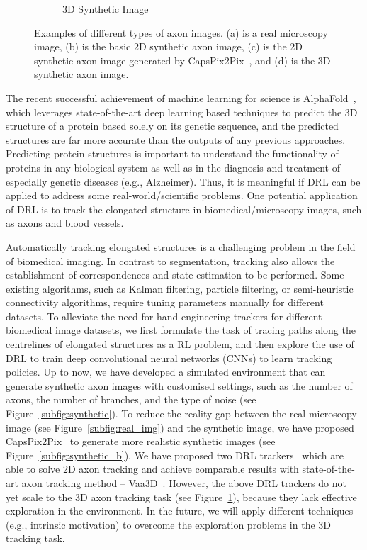 \begin{figure}[h]
\begin{subfigure}[t]{0.24\textwidth}
    \caption{3D Synthetic Image}
    \label{subfig:3d_synthetic}
  \end{subfigure}\hfill
  \caption[Examples of different types of axon images.]{Examples of different types of axon images. (a) is a real microscopy image, (b) is the basic 2D synthetic axon image, (c) is the 2D synthetic axon image generated by CapsPix2Pix~\cite{bass2018image}, and (d) is the 3D synthetic axon image.} 
  \label{fig:axon_env}
\end{figure}
The recent successful achievement of machine learning for science is AlphaFold~\cite{jumper2021highly}, which leverages state-of-the-art deep learning based techniques to predict the 3D structure of a protein based solely on its genetic sequence, and the predicted structures are far more accurate than the outputs of any previous approaches. Predicting protein structures is important to understand the functionality of proteins in any biological system as well as in the diagnosis and treatment of especially genetic diseases (e.g., Alzheimer). Thus, it is meaningful if DRL can be applied to address some real-world/scientific problems. One potential application of DRL is to track the elongated structure in biomedical/microscopy images, such as axons and blood vessels. 

Automatically tracking elongated structures is a challenging problem in the field of biomedical imaging. In contrast to segmentation, tracking also allows the establishment of correspondences and state estimation to be performed. Some existing algorithms, such as Kalman filtering, particle filtering, or semi-heuristic connectivity algorithms, require tuning parameters manually for different datasets. To alleviate the need for hand-engineering trackers for different biomedical image datasets, we
first formulate the task of tracing paths along the centrelines of elongated structures as a RL problem, and then explore the use of DRL to train deep convolutional neural networks (CNNs) to learn tracking policies. Up to now, we have developed a simulated environment that can generate synthetic axon images with customised settings, such as the number of axons, the number of branches, and the type of noise (see Figure~\ref{subfig:synthetic}). To reduce the reality gap between the real microscopy image (see Figure~\ref{subfig:real_img}) and the synthetic image, we have proposed CapsPix2Pix~\cite{bass2018image} to generate more realistic synthetic images (see Figure~\ref{subfig:synthetic_b}). We have proposed two DRL trackers~\cite{dai2019deep,balaram2019maximum} which are able to solve 2D axon tracking and achieve comparable results with state-of-the-art axon tracking method -- Vaa3D~\cite{peng2010v3d}. However, the above DRL trackers do not yet scale to the 3D axon tracking task (see Figure~\ref{subfig:3d_synthetic}), because they lack effective exploration in the environment. In the future, we will apply different techniques (e.g., intrinsic motivation) to overcome the exploration problems in the 3D tracking task.

